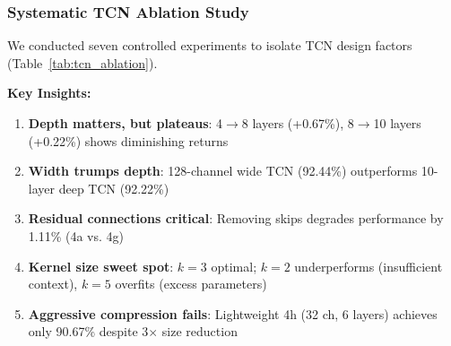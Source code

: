 \documentclass[conference]{IEEEtran}
\begin{document}
\subsubsection{Systematic TCN Ablation Study}

We conducted seven controlled experiments to isolate TCN design factors (Table~\ref{tab:tcn_ablation}).

\begin{table}[h]
\centering
\caption{TCN Ablation Study (64$\times$300 input, Mixup $\alpha=0.2$)}
\label{tab:tcn_ablation}
\end{table}

\noindent\textbf{Key Insights:}
\begin{enumerate}
    \item \textbf{Depth matters, but plateaus}: 4$\to$8 layers (+0.67\%), 8$\to$10 layers (+0.22\%) shows diminishing returns
    \item \textbf{Width trumps depth}: 128-channel wide TCN (92.44\%) outperforms 10-layer deep TCN (92.22\%)
    \item \textbf{Residual connections critical}: Removing skips degrades performance by 1.11\% (4a vs. 4g)
    \item \textbf{Kernel size sweet spot}: $k=3$ optimal; $k=2$ underperforms (insufficient context), $k=5$ overfits (excess parameters)
    \item \textbf{Aggressive compression fails}: Lightweight 4h (32 ch, 6 layers) achieves only 90.67\% despite 3$\times$ size reduction
\end{enumerate}
\end{document}
